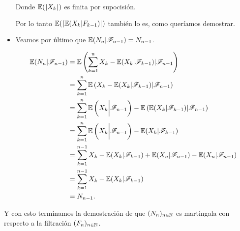 \begin{itemize}
        Donde $\mathbb{E}(\hspace{.25mm}\left|X_k\right|\hspace{.25mm})$ es finita por supocisión.\par\null
        
        Por lo tanto $\mathbb{E}(\hspace{.25mm}\left|\mathbb{E}(X_k | F_{k-1})\right|\hspace{.25mm})$ también lo es, como queríamos demostrar.\par\null


    \item
        Veamos por último que $\mathbb{E}(N_n | \mathscr{F}_{n-1}) = N_{n-1}$.
        
        \begin{align}
            \mathbb{E}(N_n | \mathscr{F}_{n-1})  &=  \mathbb{E}\left(\sum_{k=1}^n X_k - \mathbb{E}(X_k | \mathscr{F}_{k-1}) | \mathscr{F}_{n-1}\right)                                     \\
                                &=  \sum_{k=1}^n \mathbb{E}\left(X_k - \mathbb{E}(X_k | \mathscr{F}_{k-1}) | \mathscr{F}_{n-1}\right)                                     \\
                                &=  \sum_{k=1}^n \mathbb{E}\left(X_k \bigg| \mathscr{F}_{n-1}\right) - \mathbb{E}\left(\mathbb{E}(X_k | \mathscr{F}_{k-1}) | \mathscr{F}_{n-1}\right)      \\
                                &=  \sum_{k=1}^n \mathbb{E}\left(X_k \bigg| \mathscr{F}_{n-1}\right) - \mathbb{E}(X_k | \mathscr{F}_{k-1})                                \\        
                                &=  \sum_{k=1}^{n-1} X_k  - \mathbb{E}(X_k | \mathscr{F}_{k-1}) + \mathbb{E}(X_n | \mathscr{F}_{n-1}) - \mathbb{E}(X_n | \mathscr{F}_{n-1})                \\
                                &=  \sum_{k=1}^{n-1} X_k  - \mathbb{E}(X_k | \mathscr{F}_{k-1})                                                          \\
                                &=  N_{n-1}.
        \end{align}
\end{itemize}

    Y con esto terminamos la demostración de que $(N_n)_{n \in \mathbb{N}}$ es martingala con respecto a la filtración $(F_n)_{n \in \mathbb{N}}$.\